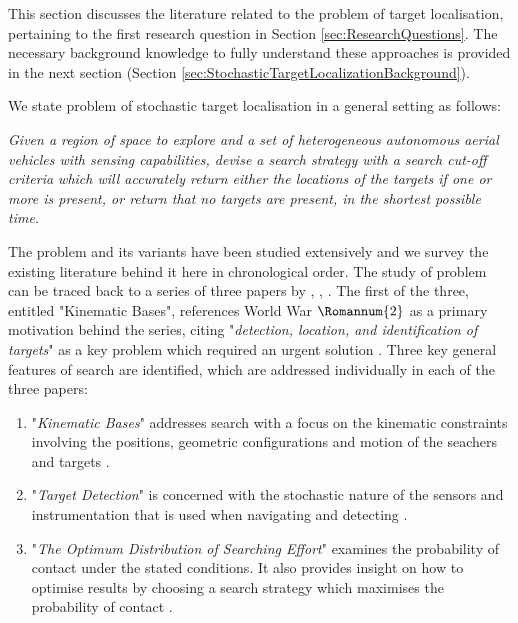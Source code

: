 


This section discusses the literature related to the problem of target localisation, pertaining to the first research question in Section \ref{sec:ResearchQuestions}. The necessary background knowledge to fully understand these approaches is provided in the next section (Section \ref{sec:StochasticTargetLocalizationBackground}).\par


We state problem of stochastic target localisation in a general setting as follows:
\\
   \par \textit{Given a region of space to explore and a set of heterogeneous autonomous aerial vehicles with sensing capabilities, devise a search strategy with a search cut-off criteria which will accurately return either the locations of the targets if one or more is present, or return that no targets are present, in the shortest possible time.}
\\
\par The problem and its variants have been studied extensively and we survey the existing literature behind it here in chronological order. The study of problem can be traced back to a series of three papers by \citeauthor{KoopmanTheoryOfSearchTargetDetection} \cite{Koopman1956THEBASES}, \cite{KoopmanTheoryOfSearchTargetDetection}, \cite{Koopman1957TheEffort}. The first of the three, entitled "Kinematic Bases", references World War $\Romannum{2}$ as a primary motivation behind the series, citing "\textit{detection, location, and identification of targets}" as a key problem which required an urgent solution \cite{Koopman1956THEBASES}. Three key general features of search are identified, which are addressed individually in each of the three papers:
\begin{enumerate}
    \item "\textit{Kinematic Bases}" addresses search with a focus on the kinematic constraints involving the positions, geometric configurations and motion of the seachers and targets \cite{Koopman1956THEBASES}.

    \item "\textit{Target Detection}" is concerned with the stochastic nature of the sensors and instrumentation that is used when navigating and detecting \cite{KoopmanTheoryOfSearchTargetDetection}.
 
    \item "\textit{The Optimum Distribution of Searching Effort}" examines the probability of contact under the stated conditions. It also provides insight on how to optimise results by choosing a search strategy which maximises the probability of contact \cite{Koopman1957TheEffort}.
\end{enumerate}
